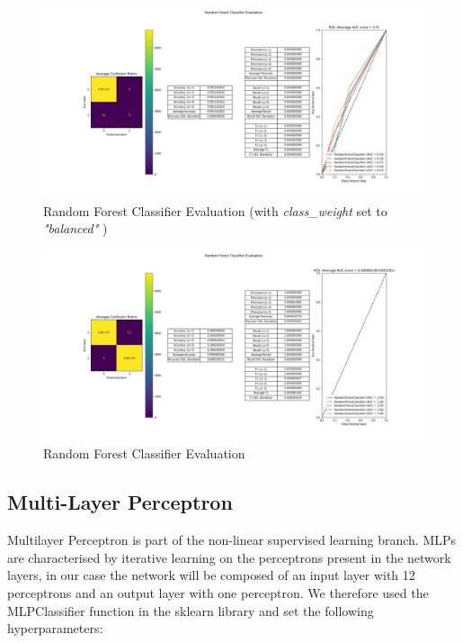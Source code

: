\begin{figure}
    \center
    \includegraphics[scale=0.32]{img/rfc_w.png}
    \caption{Random Forest Classifier Evaluation (with \textit{class\_weight} set to \textit{"balanced"} )}
    \label{rfc_w}
\end{figure}

\begin{figure}
    \center
    \includegraphics[scale=0.32]{img/rfc_d.png}
    \caption{Random Forest Classifier Evaluation}
    \label{rfc}
\end{figure}

\subsection{Multi-Layer Perceptron}
Multilayer Perceptron is part of the non-linear supervised learning branch. MLPs are characterised by iterative learning on the perceptrons present in the network layers, in our case the network will be composed of an input layer with 12 perceptrons and an output layer with one perceptron.
We therefore used the MLPClassifier function in the sklearn library and set the following hyperparameters:

